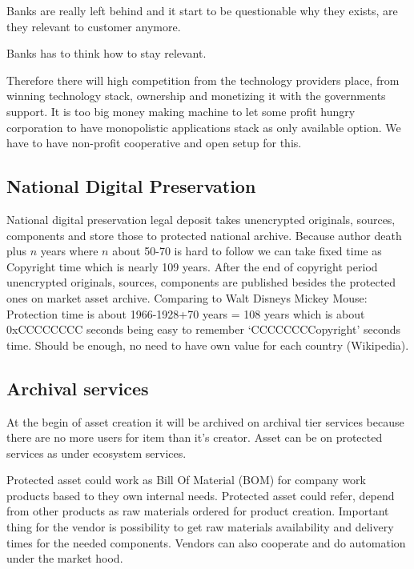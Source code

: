 Banks are really left behind and it start to be questionable why they exists,
are they relevant to customer anymore. 

Banks has to think how to stay relevant.

Therefore there will high competition from the technology pro\-viders place,
from winning technology stack, ownership and monetizing it with the
governments support. It is too big money making machine to let some profit
hungry corporation to have monopolistic applications stack as only available
option. We have to have non-profit cooperative and open setup for this.

\subsection{National Digital Preservation}
\label{digital_preservation}
National digital preservation legal deposit\allowbreak\cite{
Vapaakappaleoikeus} takes unencrypted ori\-gi\-nals, sources, components and
store those to protected national arc\-hi\-ve. Because author death plus $n$
years where $n$ about 50-70 is hard to follow we can take fixed time as
Copyright time which is nearly 109 years. After the end of copyright period
unencrypted originals, sources, components are published besides the protected
ones on market asset archive. Comparing to Walt Disneys Mickey Mouse:
Protection time is about 1966-1928+70 years = 108 years which is about
0xCCCCCCCC seconds being easy to remember `CCCCCCCCopyright' seconds time.
Should be enough, no need to have own value for each country
(Wikipedia\allowbreak\cite{CopyrightLengths}).

\subsection{Archival services}
\label{archival_services}
At the begin of asset creation it will be archived on archival tier services
because there are no more users for item than it's creator. Asset can be on
protected services as under ecosystem services.

Protected asset could work as Bill Of Material (BOM) for company work products
based to they own internal needs. Protected asset could refer, depend from
other products as raw materials ordered for product creation. Important thing
for the vendor is possibility to get raw materials availability and delivery
times for the needed components. Vendors can also cooperate and  do automation
under the market hood.

